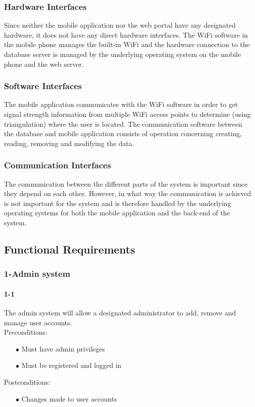 \documentclass[a4paper,12pt]{article}
\begin{document}
\subsubsection{Hardware Interfaces}
Since neither the mobile application nor the web portal have any designated hardware, it does not have any direct hardware interfaces. The WiFi software in the mobile phone manages the built-in WiFi and the hardware connection to the database server is managed by the underlying operating system on the mobile phone and the web server. 
\subsubsection{Software Interfaces}
The mobile application communicates with the WiFi software in order to get signal strength information from multiple WiFi access points to determine (using triangulation) where the user is located. The communication software between the database and mobile application consists of operation concerning creating, reading, removing and modifying the data.
\subsubsection{Communication Interfaces}
The communication between the different parts of the system is important since they depend on each other. However, in what way the communication is achieved is not important for the system and is therefore handled by the underlying operating systems for both the mobile application and the back-end of the system.
\subsection{Functional Requirements}
\subsubsection{1-Admin system}
\paragraph{1-1}
The admin system will allow a designated administrator to add, remove and manage user accounts.\\
Preconditions:
\begin{itemize} 
	\item[$\bullet$] Must have admin privileges
	\item[$\bullet$] Must be registered and logged in
\end{itemize}
Postconditions:
\begin{itemize}
	\item[$\bullet$] Changes made to user accounts
\end{itemize}
\end{document}
